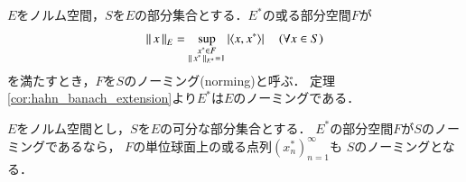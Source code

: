 	\begin{screen}
		\begin{dfn}[ノーミング]
			$E$をノルム空間，$S$を$E$の部分集合とする．$E^*$の或る部分空間$F$が
			\begin{align}
				\Norm{x}{E} = \sup{\substack{x^* \in F \\ \Norm{x^*}{E^*} = 1}}{\left| \inprod<x,x^*> \right|}
				\quad (\forall x \in S)
				\label{eq:dfn_norming}
			\end{align}
			を満たすとき，$F$を$S$のノーミング(norming)と呼ぶ．
			定理\ref{cor:hahn_banach_extension}より$E^*$は$E$のノーミングである．
		\end{dfn}
	\end{screen}
	
	\begin{screen}
		\begin{lem}[単位球面上のノーミング] 
			$E$をノルム空間とし，$S$を$E$の可分な部分集合とする．
			$E^*$の部分空間$F$が$S$のノーミングであるなら，
			$F$の単位球面上の或る点列$\left( x^*_n \right)_{n=1}^{\infty}$も
			$S$のノーミングとなる．
		\end{lem}
	\end{screen}
	
